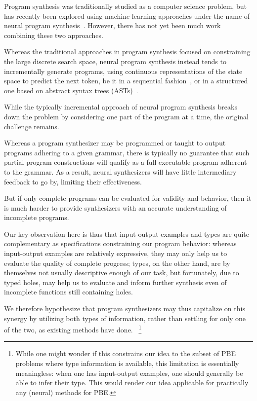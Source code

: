 \documentclass{article}
\begin{document}
Program synthesis was traditionally studied as a computer science problem,
but has recently been explored using machine learning approaches under the name of neural program synthesis~\citep{nps}.
However, there has not yet been much work combining these two approaches.

Whereas the traditional approaches in program synthesis focused on constraining the large discrete search space,
neural program synthesis instead tends to incrementally generate programs,
using continuous representations of the state space to predict the next token,
be it in a sequential fashion~\citep{alphanpi},
or in a structured one based on abstract syntax trees (ASTs)~\citep{nsps}.

While the typically incremental approach of neural program synthesis breaks down the problem by considering one part of the program at a time, the original challenge remains.

Whereas a program synthesizer may be programmed or taught to output programs adhering to a given grammar,
there is typically no guarantee that such partial program constructions will qualify as a full executable program adherent to the grammar.
As a result, neural synthesizers will have little intermediary feedback to go by, limiting their effectiveness.

But if only complete programs can be evaluated for validity and behavior, then 
it is much harder to provide synthesizers with an accurate understanding of incomplete programs.

Our key observation here is thus that input-output examples and types are quite complementary as specifications constraining our program behavior:
whereas input-output examples are relatively expressive, they may only help us to evaluate the quality of complete progress;
types, on the other hand, are by themselves not usually descriptive enough of our task,
but fortunately, due to typed holes,
may help us to evaluate and inform further synthesis even of incomplete functions still containing holes.

We therefore hypothesize that program synthesizers may thus capitalize on this synergy by utilizing both types of information,
rather than settling for only one of the two, as existing methods have done.%
~\footnote{While one might wonder if this constrains our idea to the subset of PBE problems where type information is available,
this limitation is essentially meaningless: when one has input-output examples, one should generally be able to infer their type.
This would render our idea applicable for practically any (neural) methods for PBE.}
\end{document}
